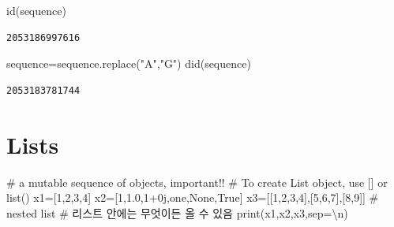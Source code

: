 \documentclass[
  letterpaper,
  DIV=11,
  numbers=noendperiod]{scrreprt}
\newenvironment{Shaded}{\begin{snugshade}}{\end{snugshade}}
\newcommand{\BuiltInTok}[1]{\textcolor[rgb]{0.00,0.23,0.31}{#1}}
\newcommand{\CharTok}[1]{\textcolor[rgb]{0.13,0.47,0.30}{#1}}
\newcommand{\CommentTok}[1]{\textcolor[rgb]{0.37,0.37,0.37}{#1}}
\newcommand{\DecValTok}[1]{\textcolor[rgb]{0.68,0.00,0.00}{#1}}
\newcommand{\FloatTok}[1]{\textcolor[rgb]{0.68,0.00,0.00}{#1}}
\newcommand{\NormalTok}[1]{\textcolor[rgb]{0.00,0.23,0.31}{#1}}
\newcommand{\OperatorTok}[1]{\textcolor[rgb]{0.37,0.37,0.37}{#1}}
\newcommand{\OtherTok}[1]{\textcolor[rgb]{0.00,0.23,0.31}{#1}}
\newcommand{\StringTok}[1]{\textcolor[rgb]{0.13,0.47,0.30}{#1}}
\newcommand{\VariableTok}[1]{\textcolor[rgb]{0.07,0.07,0.07}{#1}}
\begin{document}
\begin{Shaded}
\begin{Highlighting}[]
\BuiltInTok{id}\NormalTok{(sequence)}
\end{Highlighting}
\end{Shaded}

\begin{verbatim}
2053186997616
\end{verbatim}

\begin{Shaded}
\begin{Highlighting}[]
\NormalTok{sequence}\OperatorTok{=}\NormalTok{sequence.replace(}\StringTok{"A"}\NormalTok{,}\StringTok{"G"}\NormalTok{)}
\NormalTok{did(sequence)}
\end{Highlighting}
\end{Shaded}

\begin{verbatim}
2053183781744
\end{verbatim}

\section{Lists}\label{lists}

\begin{Shaded}
\begin{Highlighting}[]
\CommentTok{\# a mutable sequence of objects, important!!}
\CommentTok{\# To create List object, use [] or list()}
\NormalTok{x1}\OperatorTok{=}\NormalTok{[}\DecValTok{1}\NormalTok{,}\DecValTok{2}\NormalTok{,}\DecValTok{3}\NormalTok{,}\DecValTok{4}\NormalTok{]}
\NormalTok{x2}\OperatorTok{=}\NormalTok{[}\DecValTok{1}\NormalTok{,}\FloatTok{1.0}\NormalTok{,}\DecValTok{1}\OperatorTok{+}\OtherTok{0j}\NormalTok{,}\StringTok{\textquotesingle{}one\textquotesingle{}}\NormalTok{,}\VariableTok{None}\NormalTok{,}\VariableTok{True}\NormalTok{]}
\NormalTok{x3}\OperatorTok{=}\NormalTok{[[}\DecValTok{1}\NormalTok{,}\DecValTok{2}\NormalTok{,}\DecValTok{3}\NormalTok{,}\DecValTok{4}\NormalTok{],[}\DecValTok{5}\NormalTok{,}\DecValTok{6}\NormalTok{,}\DecValTok{7}\NormalTok{],[}\DecValTok{8}\NormalTok{,}\DecValTok{9}\NormalTok{]] }\CommentTok{\# nested list}
\CommentTok{\# 리스트 안에는 무엇이든 올 수 있음}
\BuiltInTok{print}\NormalTok{(x1,x2,x3,sep}\OperatorTok{=}\StringTok{\textquotesingle{}}\CharTok{\textbackslash{}n}\StringTok{\textquotesingle{}}\NormalTok{)}
\end{Highlighting}
\end{Shaded}
\end{document}
